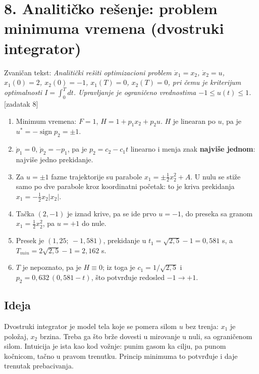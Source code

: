 \documentclass[11pt,a4paper,parskip=half,headsepline,numbers=noenddot]{scrartcl}
\DeclareRobustCommand{\izvor}[1]{{\small\color{izvorC}[#1]}}
\begin{document}
\section{8. Analitičko rešenje: problem minimuma vremena (dvostruki integrator)}

Zvaničan tekst: \emph{Analitički rešiti optimizacioni problem \(\dot x_1 = x_2\), \(\dot x_2 = u\), \(x_1(0) = 2\), \(x_2(0) = -1\), \(x_1(T) = 0\), \(x_2(T) = 0\), pri čemu je kriterijum optimalnosti \(I = \int_0^T dt\). Upravljanje je ograničeno vrednostima \(-1 \le u(t) \le 1\).} \izvor{zadatak 8}

\begin{kljucna}
\begin{enumerate}
\def\labelenumi{\arabic{enumi}.}
\item Minimum vremena: \(F = 1\), \(H = 1 + p_1x_2 + p_2u\). \(H\) je linearan po \(u\), pa je \(u^* = -\operatorname{sign}p_2 = \pm1\).
\item \(\dot p_1 = 0\), \(\dot p_2 = -p_1\), pa je \(p_2 = c_2 - c_1t\) linearno i menja znak \textbf{najviše jednom}: najviše jedno prekidanje.
\item Za \(u = \pm1\) fazne trajektorije su parabole \(x_1 = \pm\frac12x_2^2 + A\). U nulu se stiže samo po dve parabole kroz koordinatni početak: to je kriva prekidanja \(x_1 = -\frac12x_2|x_2|\).
\item Tačka \((2, -1)\) je iznad krive, pa se ide prvo \(u = -1\), do preseka sa granom \(x_1 = \frac12x_2^2\), pa \(u = +1\) do nule.
\item Presek je \((1{,}25;\ -1{,}581)\), prekidanje u \(t_1 = \sqrt{2{,}5} - 1 = 0{,}581\) s, a \(T_{min} = 2\sqrt{2{,}5} - 1 = 2{,}162\) s.
\item \(T\) je nepoznato, pa je \(H \equiv 0\); iz toga je \(c_1 = 1/\sqrt{2{,}5}\) i \(p_2 = 0{,}632\,(0{,}581 - t)\), što potvrđuje redosled \(-1 \to +1\).
\end{enumerate}
\end{kljucna}

\subsection{Ideja}

Dvostruki integrator je model tela koje se pomera silom \(u\) bez trenja: \(x_1\) je položaj, \(x_2\) brzina. Treba ga što brže dovesti u mirovanje u nuli, sa ograničenom silom. Intuicija je ista kao kod vožnje: punim gasom ka cilju, pa punom kočnicom, tačno u pravom trenutku. Princip minimuma to potvrđuje i daje trenutak prebacivanja.
\end{document}
